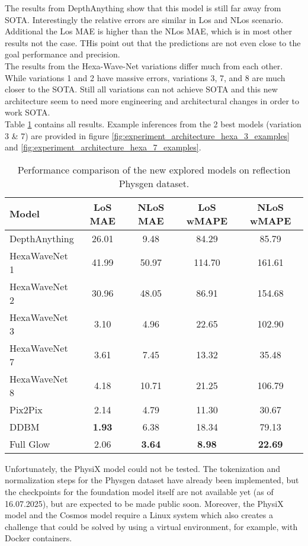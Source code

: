 		The results from DepthAnything show that this model is still far away from SOTA. Interestingly the relative errors are similar in Los and NLos scenario. Additional the Los MAE is higher than the NLos MAE, which is in most other results not the case. THis point out that the predictions are not even close to the goal performance and precision.\\
		The results from the Hexa-Wave-Net variations differ much from each other. While variations 1 and 2 have massive errors, variations 3, 7, and 8 are much closer to the SOTA. Still all variations can not achieve SOTA and this new architecture seem to need more engineering and architectural changes in order to work SOTA.\\
		Table \ref{tab:experiment_architecture_results} contains all results. Example inferences from the 2 best models (variation 3 \& 7) are provided in figure \ref{fig:experiment_architecture_hexa_3_examples} and \ref{fig:experiment_architecture_hexa_7_examples}.
		
		
		\begin{table}[h!]
			\centering
			\begin{tabular}{|l|c|c|c|c|}
				\hline
				\textbf{Model} & \textbf{LoS MAE} & \textbf{NLoS MAE} & \textbf{LoS wMAPE} & \textbf{NLoS wMAPE} \\
				\hline
				DepthAnything & 26.01 & 9.48 & 84.29 & 85.79 \\
				HexaWaveNet 1 & 41.99 & 50.97 & 114.70 & 161.61 \\
				HexaWaveNet 2 & 30.96 & 48.05 & 86.91 & 154.68 \\
				HexaWaveNet 3 & 3.10 & 4.96 & 22.65 & 102.90 \\
				HexaWaveNet 7 & 3.61 & 7.45 & 13.32 & 35.48 \\
				HexaWaveNet 8 & 4.18 & 10.71 & 21.25 & 106.79 \\
				Pix2Pix & 2.14 & 4.79 & 11.30 & 30.67 \\
				DDBM & \textbf{1.93} & 6.38 & 18.34 & 79.13 \\
				Full Glow & 2.06 & \textbf{3.64} & \textbf{8.98} & \textbf{22.69} \\
				\hline
			\end{tabular}
			\caption{Performance comparison of the new explored models on reflection Physgen dataset.}
			\label{tab:experiment_architecture_results}
		\end{table}
		\FloatBarrier
		Unfortunately, the PhysiX model could not be tested. The tokenization and normalization steps for the Physgen dataset have already been implemented, but the checkpoints for the foundation model itself are not available yet (as of 16.07.2025), but are expected to be made public soon. Moreover, the PhysiX model and the Cosmos model require a Linux system which also creates a challenge that could be solved by using a virtual environment, for example, with Docker containers.
		
